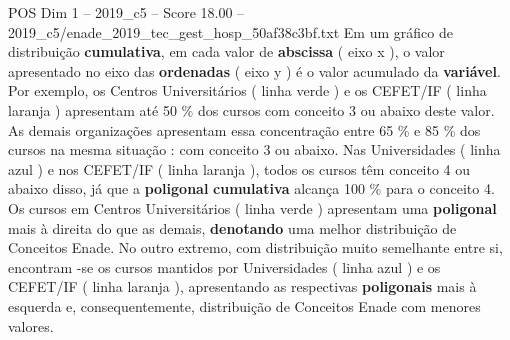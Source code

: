 \begin{textsample}{POS Dim 1 – 2019\_c5 – Score 18.00 – 2019\_c5/enade\_2019\_tec\_gest\_hosp\_50af38c3bf.txt}
Em um gráfico de distribuição \textbf{cumulativa}, em cada valor de \textbf{abscissa} ( eixo x ), o valor apresentado no eixo das \textbf{ordenadas} ( eixo y ) é o valor acumulado da \textbf{variável}.
Por exemplo, os Centros Universitários ( linha verde ) e os CEFET/IF ( linha laranja ) apresentam até 50 \% dos cursos com conceito 3 ou abaixo deste valor.
As demais organizações apresentam essa concentração entre 65 \% e 85 \% dos cursos na mesma situação : com conceito 3 ou abaixo.
Nas Universidades ( linha azul ) e nos CEFET/IF ( linha laranja ), todos os cursos têm conceito 4 ou abaixo disso, já que a \textbf{poligonal} \textbf{cumulativa} alcança 100 \% para o conceito 4.
Os cursos em Centros Universitários ( linha verde ) apresentam uma \textbf{poligonal} mais à direita do que as demais, \textbf{denotando} uma melhor distribuição de Conceitos Enade.
No outro extremo, com distribuição muito semelhante entre si, encontram -se os cursos mantidos por Universidades ( linha azul ) e os CEFET/IF ( linha laranja ), apresentando as respectivas \textbf{poligonais} mais à esquerda e, consequentemente, distribuição de Conceitos Enade com menores valores.

\end{textsample}
